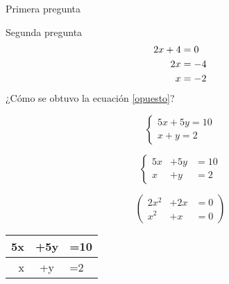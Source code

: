 \documentclass[a4paper,12pt]{exam}
\begin{document}
\vspace{0.5cm}

\begin{questions}
 
\question Primera pregunta
 
\question Segunda pregunta
	\begin{align}
		2x+4 & =0 \notag \\
		2x & =-4 \label{opuesto}\\
		x & =-2
	\end{align}
	¿Cómo se obtuvo la ecuación \ref{opuesto}?
	
\end{questions}

\[
\left \{
\begin{array}{l}
5x+5y=10\\
x+y=2
\end{array}
\right .
\]

\[
\left \{
\begin{array}{rcl}
5x & +5y & =10\\
x & +y & =2
\end{array}
\right .
\]

\[
\left(
\begin{array}{rcl}
2x^2 & +2x & =0\\
x^2 & +x & =0
\end{array}
\right)
\]

\begin{center}
\begin{tabular}{r|c|l}
5x & +5y & =10 \\
\hline
x & +y & =2
\end{tabular}

\end{center}
\end{document}
